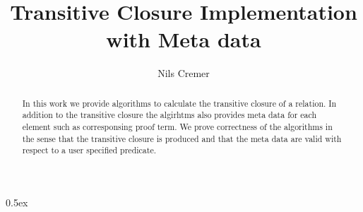 \documentclass[11pt,a4paper]{article}
\begin{document}
\title{Transitive Closure Implementation with Meta data}
\author{Nils Cremer}
\maketitle

\begin{abstract}
In this work we provide algorithms to calculate the transitive closure of a relation.
In addition to the transitive closure the algirhtms also provides meta data for each element such as corresponsing proof term.
We prove correctness of the algorithms in the sense that the transitive closure is produced and that the meta data are valid with respect to a user specified predicate.
\end{abstract}

\tableofcontents

\parindent 0pt\parskip 0.5ex



%
%
\end{document}
